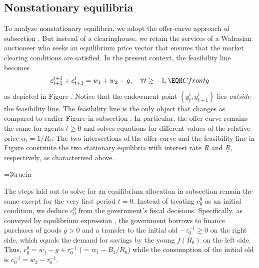 \subsection{Nonstationary equilibria}
To analyze nonstationary equilibria, we adopt the offer-curve 
approach of subsection . But instead of
a clearinghouse, we retain the services of  a Walrasian auctioneer
who seeks an equilibrium price vector that ensures that the market 
clearing conditions  are satisfied. In the
present context, the feasibility line 
becomes
$$c_{t+1}^{t+1} + c_{t+1}^t 
     = w_1 + w_2 -g , \quad \forall t \geq -1,   \EQN Cfrontg
$$
as depicted in Figure . Notice that the endowment point 
$(y^t_t, y^t_{t+1})$ lies {\it outside} the feasibility line.
The feasibility line 
is the only object that changes as compared to earlier 
Figure  in subsection . In 
particular, the offer curve remains the same for agents $t\geq 0$ 
and solves equations  for different values of
the relative price $\alpha_t = 1/ R_t$. The two intersections
of the offer curve and the feasibility line in 
Figure  constitute the two stationary equilibria 
with interest rate $\overline R$ and $\underline R$, respectively,
as characterized above.


\centerline{\epsfxsize=3truein}
\caption{Equilibria with debt- or money-financed government deficit finance.}
\endfigure

The steps laid out to solve for an equilibrium
allocation in subsection  remain
the same except for the very first period $t=0$.
Instead of treating $c^0_0$ as an initial condition,
we deduce $c^0_0$ from the government's fiscal decisions.
Specifically, as conveyed by  
equilibrium expression ,  
the government borrows to finance purchases of 
goods $g>0$ and a transfer to the initial old  
$-\tau^{-1}_0\geq 0$ on the right side, which equals
the demand for savings by the young $f(R_0)$
on the left side. Thus, 
$c^0_0 = w_1 -g + \tau^{-1}_0$ ($=w_1 - B_1/R_0$)
while the consumption of the initial old
is $c^{-1}_0 = w_2 - \tau^{-1}_0$.

